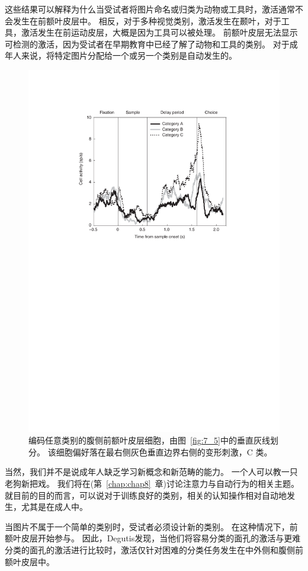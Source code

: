 这些结果可以解释为什么当受试者将图片命名或归类为动物或工具时，激活通常不会发生在前额叶皮层中\cite{martin2007representation}。
相反，对于多种视觉类别，激活发生在颞叶，对于工具，激活发生在前运动皮层，大概是因为工具可以被处理。
前额叶皮层无法显示可检测的激活，因为受试者在早期教育中已经了解了动物和工具的类别。
对于成年人来说，将特定图片分配给一个或另一个类别是自动发生的。


\begin{figure}
	\centering
	\includegraphics[width=0.6\linewidth]{chap7/7_7}
	\caption{编码任意类别的腹侧前额叶皮层细胞，由图~\ref{fig:7_5}中的垂直灰线划分。
		该细胞偏好落在最右侧灰色垂直边界右侧的变形刺激，C 类\cite{freedman2002visual}。\label{fig:7_7}}
\end{figure}
\par


当然，我们并不是说成年人缺乏学习新概念和新范畴的能力。 
一个人可以教一只老狗新把戏。 
我们将在(第~\ref{chap:chap8}~章)讨论注意力与自动行为的相关主题。
就目前的目的而言，可以说对于训练良好的类别，相关的认知操作相对自动地发生，尤其是在成人中。
\par


当图片不属于一个简单的类别时，受试者必须设计新的类别。 
在这种情况下，前额叶皮层开始参与。 
因此，Degutis\cite{degutis2007distinct}发现，当他们将容易分类的面孔的激活与更难分类的面孔的激活进行比较时，激活仅针对困难的分类任务发生在中外侧和腹侧前额叶皮层中。


